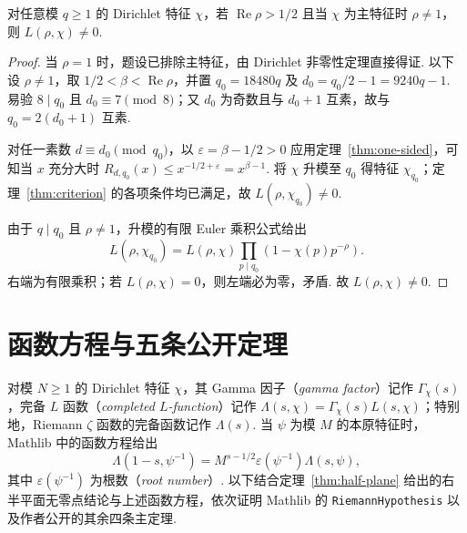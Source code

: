 \begin{theorem}
\label{thm:half-plane}
\emitthmsource
对任意模 $q\ge1$ 的 Dirichlet 特征 $\chi$，若 $\operatorname{Re}\rho>1/2$ 且当 $\chi$ 为主特征时 $\rho\ne1$，则 $L(\rho,\chi)\ne0$.
\end{theorem}
\begin{proof}
当 $\rho=1$ 时，题设已排除主特征，由 Dirichlet 非零性定理直接得证. 以下设 $\rho\ne1$，取 $1/2<\beta<\operatorname{Re}\rho$，并置 $q_0=18480q$ 及 $d_0=q_0/2-1=9240q-1$. 易验 $8\mid q_0$ 且 $d_0\equiv7\pmod8$；又 $d_0$ 为奇数且与 $d_0+1$ 互素，故与 $q_0=2(d_0+1)$ 互素.

对任一素数 $d\equiv d_0\pmod{q_0}$，以 $\varepsilon=\beta-1/2>0$ 应用定理~\ref{thm:one-sided}，可知当 $x$ 充分大时 $R_{d,q_0}(x)\le x^{-1/2+\varepsilon}=x^{\beta-1}$. 将 $\chi$ 升模至 $q_0$ 得特征 $\chi_{q_0}$；定理~\ref{thm:criterion} 的各项条件均已满足，故 $L(\rho,\chi_{q_0})\ne0$.

由于 $q\mid q_0$ 且 $\rho\ne1$，升模的有限 Euler 乘积公式给出
\[
 L(\rho,\chi_{q_0})=L(\rho,\chi)\prod_{p\mid q_0}(1-\chi(p)p^{-\rho}).
\]
右端为有限乘积；若 $L(\rho,\chi)=0$，则左端必为零，矛盾. 故 $L(\rho,\chi)\ne0$.
\end{proof}

\section{函数方程与五条公开定理}
\label{sec:public-theorems}

\begin{definition}
\label{def:completed-l-and-statements}
对模 $N\ge1$ 的 Dirichlet 特征 $\chi$，其 Gamma 因子（\emph{gamma factor}）记作 $\Gamma_\chi(s)$，完备 $L$ 函数（\emph{completed $L$-function}）记作 $\Lambda(s,\chi)=\Gamma_\chi(s)L(s,\chi)$；特别地，Riemann $\zeta$ 函数的完备函数记作 $\Lambda(s)$. 当 $\psi$ 为模 $M$ 的本原特征时，Mathlib 中的函数方程给出
\[
 \Lambda(1-s,\psi^{-1})=M^{s-1/2}\varepsilon(\psi^{-1})\Lambda(s,\psi),
\]
其中 $\varepsilon(\psi^{-1})$ 为根数（\emph{root number}）. 以下结合定理~\ref{thm:half-plane} 给出的右半平面无零点结论与上述函数方程，依次证明 Mathlib 的 \texttt{RiemannHypothesis} 以及作者公开的其余四条主定理.
\end{definition}

